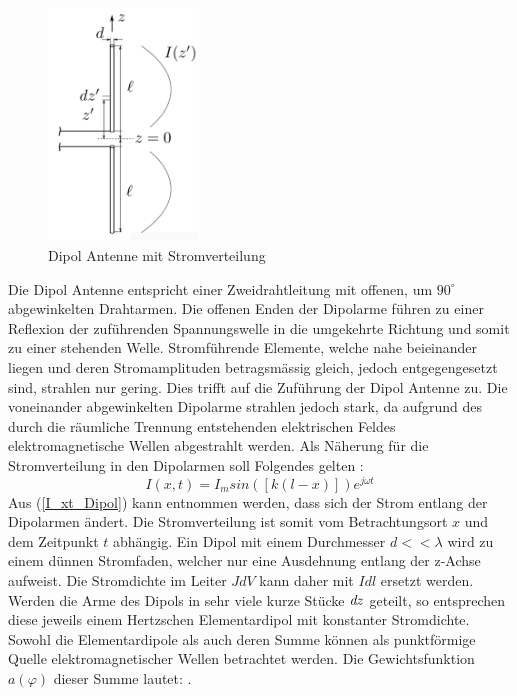 \begin{figure}[!ht]
	\centering
	\includegraphics[width=4cm]{content/bilder/Dipol_EMANT_S42.pdf}%
	\caption{Dipol Antenne mit Stromverteilung \cite{Tekom}}
	\label{FitzDipol}
\end{figure}
Die Dipol Antenne entspricht einer Zweidrahtleitung mit offenen, um $90^\circ$ abgewinkelten Drahtarmen. Die offenen Enden der Dipolarme führen zu einer Reflexion der zuführenden Spannungswelle in die umgekehrte Richtung und somit zu einer stehenden Welle. Stromführende Elemente, welche nahe beieinander liegen und deren Stromamplituden betragsmässig gleich, jedoch entgegengesetzt sind, strahlen nur gering. Dies trifft auf die Zuführung der Dipol Antenne zu. Die voneinander abgewinkelten Dipolarme strahlen jedoch stark, da aufgrund des durch die räumliche Trennung entstehenden elektrischen Feldes elektromagnetische Wellen abgestrahlt werden.
Als Näherung für die Stromverteilung in den Dipolarmen soll Folgendes gelten \cite{elliott1981antenna}:
\begin{equation}\label{I_xt_Dipol} 
I(x,t) =I_{m}sin([k(l-x)])e^{j\omega t}
\end{equation}
Aus  (\ref{I_xt_Dipol}) kann entnommen werden, dass sich der Strom entlang der Dipolarmen ändert. Die Stromverteilung ist somit vom Betrachtungsort $x$ und dem Zeitpunkt $t$ abhängig. Ein Dipol mit einem Durchmesser $d<<\lambda$ wird  zu einem dünnen Stromfaden, welcher nur eine Ausdehnung entlang der z-Achse aufweist. Die Stromdichte im Leiter $J \textit{d}V$ kann daher mit $I\textit{d}l$ ersetzt werden. Werden die Arme des Dipols in sehr viele kurze Stücke $\textit{\textit{d}}z$ geteilt, so entsprechen diese jeweils einem Hertzschen Elementardipol mit konstanter Stromdichte. Sowohl die Elementardipole als auch deren Summe können als punktförmige Quelle elektromagnetischer Wellen betrachtet werden. Die Gewichtsfunktion $a(\varphi)$ dieser Summe lautet: \cite{elliott1981antenna}.\\

